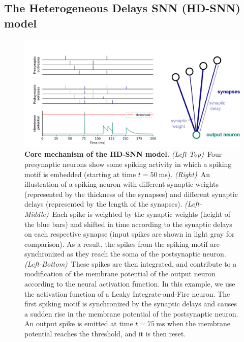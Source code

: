 \documentclass[default]{sn-jnl}%
\theoremstyle{thmstyleone}%
\theoremstyle{thmstyletwo}%
\theoremstyle{thmstylethree}%
\newcommand{\ms}{\si{\milli\second}}%
\begin{document}
\subsection{The Heterogeneous Delays SNN (HD-SNN) model}
%
\begin{figure}%
    \centering
    \includegraphics[width=0.980\linewidth]{figures/HDSNN_graph.pdf}
    \caption{\textbf{Core mechanism of the HD-SNN model.} \textit{(Left-Top)}~Four presynaptic neurons show some spiking activity in which a spiking motif is embedded (starting at time $t=50~\ms$). \textit{(Right)}~An illustration of a spiking neuron with different synaptic weights (represented by the thickness of the synapses) and different synaptic delays (represented by the length of the synapses). \textit{(Left-Middle)}~Each spike is weighted by the synaptic weights (height of the blue bars) and shifted in time according to the synaptic delays on each respective synapse (input spikes are shown in light gray for comparison). As a result, the spikes from the spiking motif are synchronized as they reach the soma of the postsynaptic neuron. \textit{(Left-Bottom)}~These spikes are then integrated, and contribute to a modification of the membrane potential of the output neuron according to the neural activation function. In this example, we use the activation function of a Leaky Integrate-and-Fire neuron. The first spiking motif is synchronized by the synaptic delays and causes a sudden rise in the membrane potential of the postsynaptic neuron. An output spike is emitted at time $t=75~\ms$ when the membrane potential reaches the threshold, and it is then reset.}%
    \label{fig:izhikevich}%
\end{figure}%
% 
\end{document}
